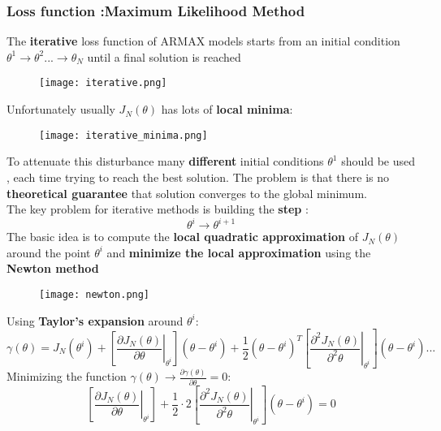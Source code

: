 \subsubsection{Loss function :Maximum Likelihood Method}
The \textbf{iterative} loss function of ARMAX models starts from an initial condition $\theta^1 \to \theta^2...\to \hat{\theta}_N$  until a final solution is reached
\begin{figure}[H]
 \centering
  \texttt{[image: iterative.png]}
\end{figure}
Unfortunately usually $J_N(\theta)$ has lots of \textbf{local minima}:
\begin{figure}[H]
 \centering
  \texttt{[image: iterative\_minima.png]}
\end{figure}
To attenuate this disturbance many \textbf{different} initial conditions  $\theta^1$ should be used , each time trying to reach the best solution. The problem is that there is no \textbf{theoretical guarantee} that solution converges to the global minimum.\\
The key problem for iterative methods is building the \textbf{step} : 
$$ \theta^i \to \theta^{i+1} $$
The basic idea is to compute the \textbf{local quadratic approximation} of $J_N(\theta)$ around the point $\theta^i$ and \textbf{minimize the local approximation} using the \textbf{Newton method} 
\begin{figure}[H]
 \centering
  \texttt{[image: newton.png]}
\end{figure}
Using \textbf{Taylor's expansion} around $\theta^i$:
$$\gamma(\theta)=  J_N(\theta^i) + \left[\left. \frac{\partial{J_N(\theta)}}{\partial{\theta}}\right|_{\theta^i} \right](\theta-\theta^i)+ \frac{1}{2}(\theta-\theta^i)^T\left[\left. \frac{\partial^2{J_N(\theta)}}{\partial^2{\theta}}\right|_{\theta^i} \right](\theta-\theta^i)...$$
Minimizing the function $\gamma(\theta) \to \frac{\partial{\gamma(\theta)}}{\partial{\theta}}=0$:
$$  \left[\left. \frac{\partial{J_N(\theta)}}{\partial{\theta}}\right|_{\theta^i} \right] + \frac{1}{2} \cdot 2 \left[\left. \frac{\partial^2{J_N(\theta)}}{\partial^2{\theta}}\right|_{\theta^i} \right] (\theta - \theta^i) =0$$

